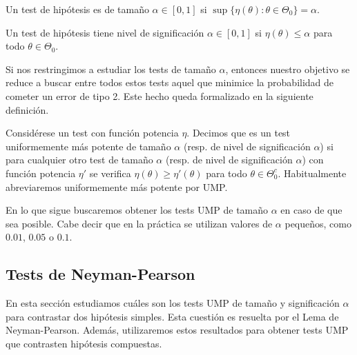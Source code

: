         \begin{definition}
            Un test de hipótesis es de tamaño $\alpha \in [0,1]$ si $\sup\{\eta(\theta): \theta \in \Theta_0\} = \alpha$.
        \end{definition}

        \begin{definition}
            Un test de hipótesis tiene nivel de significación $\alpha \in [0,1]$ si $\eta(\theta) \le \alpha$ para todo $\theta \in \Theta_0$.
        \end{definition}

        Si nos restringimos a estudiar los tests de tamaño $\alpha$, entonces nuestro objetivo se reduce a buscar entre todos estos tests aquel que minimice la probabilidad de cometer un error de tipo 2. Este hecho queda formalizado en la siguiente definición.

        \begin{definition}
            Considérese un test con función potencia $\eta$. Decimos que es un test uniformemente más potente de tamaño $\alpha$ (resp. de nivel de significación $\alpha$)  si para cualquier otro test de tamaño $\alpha$ (resp. de nivel de significación $\alpha$) con función potencia $\eta'$ se verifica $\eta(\theta) \ge \eta'(\theta)$ para todo $\theta \in \Theta_0^c$. Habitualmente abreviaremos uniformemente más potente por UMP.
        \end{definition}

        En lo que sigue buscaremos obtener los tests UMP de tamaño $\alpha$ en caso de que sea posible. Cabe decir que en la práctica se utilizan valores de $\alpha$ pequeños, como $0.01$, $0.05$ o $0.1$.

    \subsection{Tests de Neyman-Pearson}

        En esta sección estudiamos cuáles son los tests UMP de tamaño y significación $\alpha$ para contrastar dos hipótesis simples. Esta cuestión es resuelta por el Lema de Neyman-Pearson. Además, utilizaremos estos resultados para obtener tests UMP que contrasten hipótesis compuestas.

